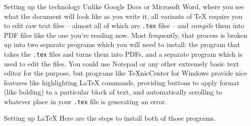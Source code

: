 \documentclass[sheet]{GameTexBase}
\begin{document}
\begin{section}{Setting up the technology}
Unlike Google Docs or Microsoft Word, where you see what the document will look like as you write it, all variants of \TeX{} require you to edit raw text files -- almost all of which are \lstinline{.tex} files -- and \emph{compile} them into PDF files like the one you're reading now.  Most frequently, that process is broken up into two separate programs which you will need to install: the program that takes the \lstinline{.tex} files and turns them into PDFs, and a separate program which is used to edit the files.  You could use Notepad or any other extremely basic text editor for the purpose, but programs like TeXnicCenter for Windows provide nice features like highlighting \LaTeX{} commands, providing buttons to apply format (like bolding) to a particular block of text, and automatically scrolling to whatever place in your \lstinline{.tex} file is generating an error.
\begin{subsection}{Setting up \LaTeX{}}
Here are the steps to install both of those programs.


\end{subsection}
\end{section}
\end{document}
